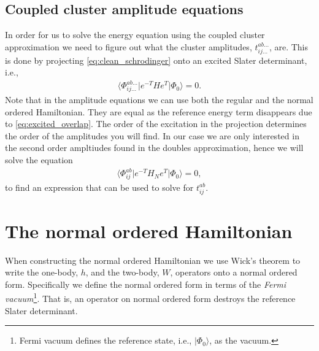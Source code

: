 \documentclass[
    a4paper, aps, twocolumn, floatfix, superscriptaddress,
    nofootinbib]{revtex4-1}
\newcommand{\1}{\mathds{1}}
\newcommand{\bra}[1]{\langle #1\lvert}
\newcommand{\ket}[1]{\rvert #1\rangle}
\newcommand{\kslat}{\ket{\Phi_0}}
\begin{document}
    \subsection{Coupled cluster amplitude equations}
        In order for us to solve the energy equation using the coupled cluster
        approximation we need to figure out what the cluster amplitudes,
        $t_{ij\dots}^{ab\dots}$, are. This is done by projecting
        \autoref{eq:clean_schrodinger} onto an excited Slater determinant, i.e.,
        \begin{align}
            \bra{\Phi_{ij\dots}^{ab\dots}}e^{-T}He^{T}\kslat
            = 0.
        \end{align}
        Note that in the amplitude equations we can use both the regular and the
        normal ordered Hamiltonian. They are equal as the reference energy term
        disappears due to \autoref{eq:excited_overlap}. The order of the
        excitation in the projection determines the order of the amplitudes you
        will find. In our case we are only interested in the second order
        ampltiudes found in the doubles approximation, hence we will solve the
        equation
        \begin{align}
            \bra{\Phi_{ij}^{ab}}e^{-T}H_N e^{T}\kslat = 0,
        \end{align}
        to find an expression that can be used to solve for $t_{ij}^{ab}$.



\appendix
\section{The normal ordered Hamiltonian}
    When constructing the normal ordered Hamiltonian we use Wick's theorem to
    write the one-body, $h$, and the two-body, $W$, operators onto a normal
    ordered form. Specifically we define the normal ordered form in terms of the
    \emph{Fermi vacuum}\footnote{Fermi vacuum defines the reference state, i.e.,
    $\kslat$, as the vacuum.}. That is, an operator on normal ordered form
    destroys the reference Slater determinant.
\end{document}
